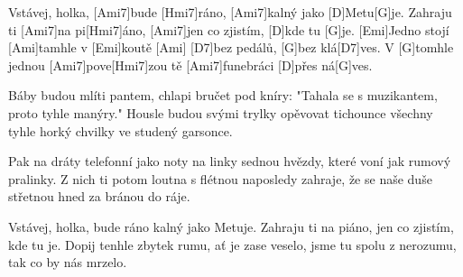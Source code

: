 
\sloka
[G]Vstávej, holka, [Ami7]bude [Hmi7]ráno,
[Ami7]kalný jako [D]Metu[G]je.
Zahraju ti [Ami7]na pi[Hmi7]áno,
[Ami7]jen co zjistím, [D]kde tu [G]je.
[Emi]Jedno stojí [Ami]tamhle v [Emi]koutě [Ami]
[D7]bez pedálů, [G]bez klá[D7]ves.
V [G]tomhle jednou [Ami7]pove[Hmi7]zou tě
[Ami7]funebráci [D]přes ná[G]ves.

\sloka
Báby budou mlíti pantem,
chlapi bručet pod kníry:
"Tahala se s muzikantem,
proto tyhle manýry."
Housle budou svými trylky
opěvovat tichounce
všechny tyhle horký chvilky
ve studený garsonce.

\sloka
Pak na dráty telefonní
jako noty na linky
sednou hvězdy, které voní
jak rumový pralinky.
Z nich ti potom loutna s flétnou
naposledy zahraje,
že se naše duše střetnou
hned za bránou do ráje.

\sloka
Vstávej, holka, bude ráno
kalný jako Metuje.
Zahraju ti na piáno,
jen co zjistím, kde tu je.
Dopij tenhle zbytek rumu,
ať je zase veselo,
jsme tu spolu z nerozumu,
tak co by nás mrzelo. 
